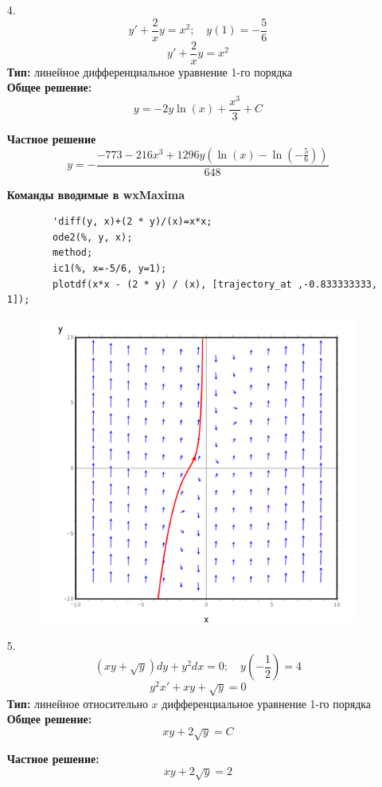 \documentclass[a4paper, 12pt, oneside]{scrartcl}
\begin{document}
\begin{enumerate}
		\item[4.]
		$$y' + \frac{2}{x}y = {x^2}; \quad y(1) = -\frac{5}{6}$$
		$$y' + \frac{2}{x}y = {x^2}$$ 
		\textbf{Тип:} линейное дифференциальное уравнение 1-го порядка \\

		\textbf{Общее решение:}
		$$y = -2y\ln{(x)} + \frac{x^{3}}{3} + C $$

		\textbf{Частное решение}
		$$y = -\frac{-773 - 216x^{3} + 1296y(\ln{(x)} - \ln{(-\frac{5}{6})})}{648}$$

		\textbf{Команды вводимые в wxMaxima }
		\begin{verbatim}
		'diff(y, x)+(2 * y)/(x)=x*x;
		ode2(%, y, x);
		method;
		ic1(%, x=-5/6, y=1);
		plotdf(x*x - (2 * y) / (x), [trajectory_at ,-0.833333333, 1]);
		\end{verbatim}
		\begin{figure}[ht]
		\center\includegraphics[width=.5\linewidth]{./src/4_}
		\end{figure}

		\item[5.]
		$$(xy + \sqrt{y})dy + y^{2}dx = 0; \quad y(-\frac{1}{2}) = 4$$
		$$y^{2}x' + xy + \sqrt{y} = 0$$ 
		\textbf{Тип: }
		линейное относительно $x$ дифференциальное уравнение 1-го порядка \\

		\textbf{Общее решение:}
		$$xy + 2\sqrt{y} = C$$ 

		\textbf{Частное решение:}
		$$xy + 2\sqrt{y} = 2$$
		

\end{enumerate}
\end{document}
